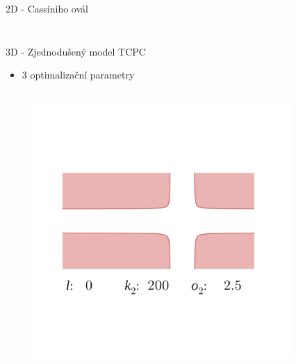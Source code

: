 \documentclass[aspectratio=169,xcolor=dvipsnames]{beamer}
\begin{document}
\begin{frame}{2D - Cassiniho ovál}
\begin{columns}
\begin{column}{.45\textwidth}
\begin{figure}
			\end{figure}
		\end{column}
	\end{columns}	
\end{frame}
\begin{frame}{3D - Zjednodušený model TCPC}
	\begin{itemize}
		\item 3 optimalizační parametry
	\end{itemize}
	\begin{columns}
		\begin{column}{.58\textwidth}
			\begin{figure}
				\includegraphics[width=1.\linewidth, trim={5cm 6cm 8cm 19cm}, clip]{Images/a.png}		
			\end{figure}
		\end{column}
		\begin{column}{.42\textwidth}
			\vspace{-15mm}
			\begin{figure}

\end{figure}
\end{column}
\end{columns}
\end{frame}
\end{document}

